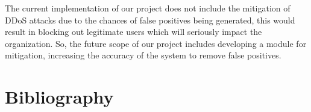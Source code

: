 \documentclass[12pt,a4paper,final]{report}
\DeclareRobustCommand{\gobblefive}[5]{}
\newcommand*{\SkipTocEntry}{\addtocontents{toc}{\gobblefive}}
\begin{document}

The current implementation of our project does not include the mitigation of DDoS attacks due to the chances of false positives being generated, this would  result in blocking out legitimate users which will seriously impact the organization. So, the future scope of our project includes developing a module for mitigation, increasing the accuracy of the system to remove false positives.


\newpage

\SkipTocEntry\chapter{Bibliography}
\thispagestyle{empty}
\newpage
\begingroup
\renewcommand{\chapter}[2]{}
\end{document}
